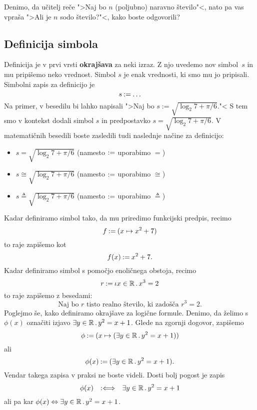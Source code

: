 \begin{vaja}
  Denimo, da učitelj reče ">Naj bo $n$ (poljubno) naravno število"<, nato pa vas vpraša ">Ali je $n$ sodo število?"<, kako boste odgovorili?
\end{vaja}

\subsection{Definicija simbola}

Definicija je v prvi vrsti \textbf{okrajšava} za neki izraz. Z njo uvedemo nov simbol~$s$ in mu pripišemo neko vrednost. Simbol $s$ je enak vrednosti, ki smo mu jo pripisali. Simbolni zapis za definicijo je
%
\begin{equation*}
  s \mathbin{{:}{=}} \ldots
\end{equation*}
%
Na primer, v besedilu bi lahko napisali ">Naj bo $s := \sqrt{\log_2 7 + \pi/6}$."< S tem smo v kontekst dodali simbol $s$ in predpostavko $s = \sqrt{\log_2 7 + \pi/6}$. V matematičnih besedili boste zasledili tudi naslednje načine za definicijo:
%
\begin{itemize}
\item $s = \sqrt{\log_2 7 + \pi/6}$ (namesto $\mathbin{{:}{=}}$ uporabimo $=$)
\item $s \cong \sqrt{\log_2 7 + \pi/6}$ (namesto $\mathbin{{:}{=}}$ uporabimo $\cong$)
\item $s \triangleq \sqrt{\log_2 7 + \pi/6}$ (namesto $\mathbin{{:}{=}}$ uporabimo $\triangleq$)
\end{itemize}
%
Kadar definiramo simbol tako, da mu priredimo funkcijski predpis, recimo
%
\begin{equation*}
  f \mathbin{{:}{=}} (x \mapsto x^2 + 7)
\end{equation*}
%
to raje zapišemo kot
%
\begin{equation*}
  f(x) \mathbin{{:}{=}} x^2 + 7.
\end{equation*}
%
Kadar definiramo simbol s pomočjo enoličnega obstoja, recimo
%
\begin{equation*}
  r \mathbin{{:}{=}} \iota x \in \mathbb{R} \,.\, x^3 = 2
\end{equation*}
%
to raje zapišemo z besedami:
%
\begin{equation*}
  \text{Naj bo $r$ tisto realno število, ki zadošča $r^3 = 2$.}
\end{equation*}
%
Poglejmo še, kako definiramo okrajšave za logične formule. Denimo, da želimo s $\phi(x)$ označiti izjavo $\exists y \in \mathbb{R} \,.\, y^2 = x + 1$. Glede na zgornji dogovor, zapišemo
%
\begin{equation*}
  \phi \mathbin{{:}{=}} (x \mapsto (\exists y \in \mathbb{R} \,.\, y^2 = x + 1))
\end{equation*}
%
ali
%
\begin{equation*}
  \phi(x) \mathbin{{:}{=}} (\exists y \in \mathbb{R} \,.\, y^2 = x + 1).
\end{equation*}
%
Vendar takega zapisa v praksi ne boste videli. Dosti bolj pogost je zapis
%
\begin{equation*}
  \phi(x) \quad {{:}{\Longleftrightarrow}}\quad \exists y \in \mathbb{R} \,.\, y^2 = x + 1
\end{equation*}
%
ali pa kar $\phi(x) \Leftrightarrow \exists y \in \mathbb{R} \,.\, y^2 = x + 1$.

